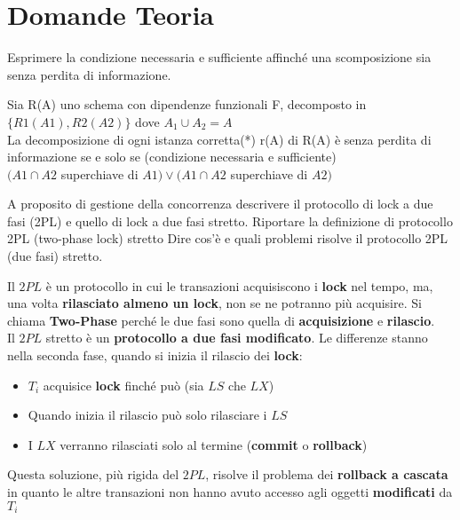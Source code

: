 \documentclass{exam}
\begin{document}
\printanswers

\section{Domande Teoria}

\begin{questions}
    \question Esprimere la condizione necessaria e sufficiente affinché una scomposizione sia senza perdita di informazione.
    \begin{solution}
    Sia R(A) uno schema con dipendenze funzionali F, decomposto in $\{R1(A1), R2(A2)\}$ dove $A_1 \cup A_2 = A$ \\
    La decomposizione di ogni istanza corretta(*) r(A) di  R(A) è senza perdita di informazione se e solo se  (condizione necessaria e sufficiente) \\  
    $(A1\cap A2$ superchiave di $A1)\vee(A1 \cap A2 $ superchiave di $A2) $
    \end{solution}
    \question A proposito di gestione della concorrenza descrivere il protocollo di lock a due fasi (2PL) e quello di lock a due fasi stretto.
    \question Riportare la definizione di protocollo 2PL (two-phase lock) stretto
    \question Dire cos’è e quali problemi risolve il protocollo 2PL (due fasi) stretto.
    \begin{solution}
        Il $2PL$ è un protocollo in cui le transazioni acquisiscono i \textbf{lock} nel tempo, ma, una volta \textbf{rilasciato almeno un lock}, non se ne potranno più
        acquisire. Si chiama \textbf{Two-Phase} perché le due fasi sono quella di \textbf{acquisizione} e \textbf{rilascio}.
        \\
        Il $2PL$ stretto è un \textbf{protocollo a due fasi modificato}. Le differenze stanno nella seconda fase, quando si inizia il rilascio dei \textbf{lock}:
        \begin{itemize}
            \item $T_i$ acquisice \textbf{lock} finché può (sia $LS$ che $LX$)
            \item Quando inizia il rilascio può solo rilasciare i $LS$
            \item I $LX$ verranno rilasciati solo al termine (\textbf{commit} o \textbf{rollback})
        \end{itemize}
        Questa soluzione, più rigida del $2PL$, risolve il problema dei \textbf{rollback a cascata} in quanto le altre transazioni non hanno avuto accesso
        agli oggetti \textbf{modificati} da $T_i$
    \end{solution}

\end{questions}
\end{document}
